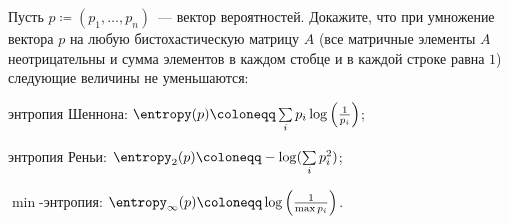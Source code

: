 Пусть $p \coloneqq (p_1, \dots, p_n)$~--- вектор вероятностей. Докажите, что при умножение вектора $p$ на
любую бистохастическую матрицу $A$ (все матричные элементы $A$ неотрицательны и сумма элементов в каждом
стобце и в каждой строке равна $1$) следующие величины не уменьшаются:
\begin{enumcyr}
    \item энтропия Шеннона: $\entropy(p) \coloneqq \sum\limits_{i} p_i \log\left(\frac{1}{p_i}\right)$;
	\item энтропия Реньи: $\entropy_2(p) \coloneqq -\log(\sum\limits_{i} p_i^2)$;
    \item $\min$-энтропия: $\entropy_{\infty}(p) \coloneqq \log\left(\frac{1}{\max p_i}\right)$.
\end{enumcyr}
